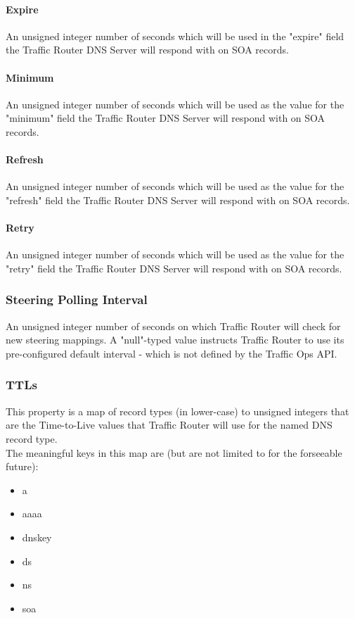 \paragraph{Expire}
An unsigned integer number of seconds which will be used in the "expire" field
the Traffic Router DNS Server will respond with on SOA records.

\paragraph{Minimum}
An unsigned integer number of seconds which will be used as the value for the
"minimum" field the Traffic Router DNS Server will respond with on SOA records.

\paragraph{Refresh}
An unsigned integer number of seconds which will be used as the value for the
"refresh" field the Traffic Router DNS Server will respond with on SOA records.

\paragraph{Retry}
An unsigned integer number of seconds which will be used as the value for the
"retry" field the Traffic Router DNS Server will respond with on SOA records.

\subsubsection{Steering Polling Interval}
An unsigned integer number of seconds on which Traffic Router will check for new
steering mappings. A "null"-typed value instructs Traffic Router to use its
pre-configured default interval - which is not defined by the Traffic Ops API.

\subsubsection{TTLs}
This property is a map of record types (in lower-case) to unsigned integers that
are the Time-to-Live values that Traffic Router will use for the named DNS
record type.\\
The meaningful keys in this map are (but are not limited to for the forseeable
future):

\begin{itemize}
	\item a
	\item aaaa
	\item dnskey
	\item ds
	\item ns
	\item soa
\end{itemize}
